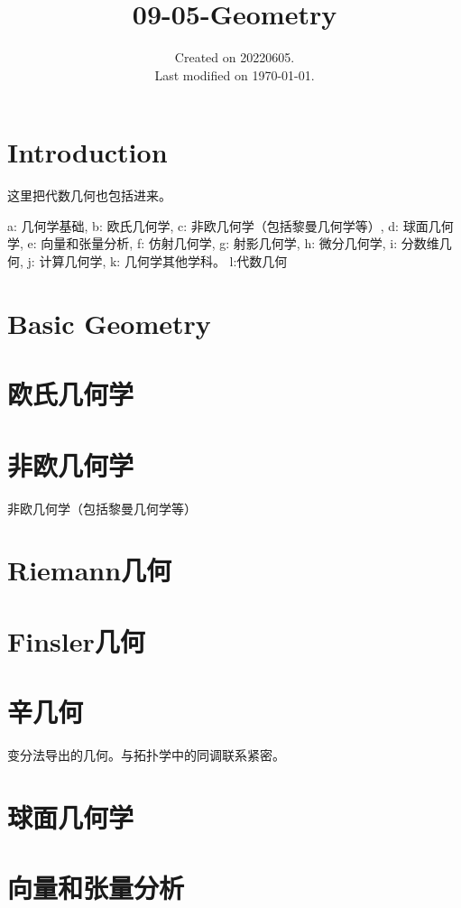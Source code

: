\documentclass[UTF8]{../09-Mathematics}
\begin{document}
\title{09-05-Geometry}
\date{Created on 20220605.\\   Last modified on \today.}
\maketitle
\tableofcontents


\chapter{Introduction}
这里把代数几何也包括进来。

a: 几何学基础, 
b: 欧氏几何学, 
c: 非欧几何学（包括黎曼几何学等）, 
d: 球面几何学, 
e: 向量和张量分析, 
f: 仿射几何学, 
g: 射影几何学, 
h: 微分几何学, 
i: 分数维几何, 
j: 计算几何学, 
k: 几何学其他学科。
l:代数几何

\chapter{Basic Geometry}

\chapter{欧氏几何学}



\chapter{非欧几何学}
非欧几何学（包括黎曼几何学等）


\chapter{Riemann几何}
\chapter{Finsler几何}

\chapter{辛几何}
变分法导出的几何。与拓扑学中的同调联系紧密。


\chapter{球面几何学}


\chapter{向量和张量分析}
\end{document}

